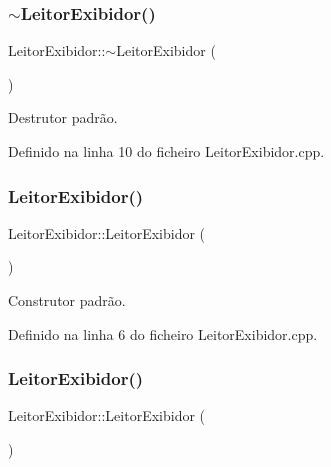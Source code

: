 \subsubsection{\texorpdfstring{$\sim$\+Leitor\+Exibidor()}{~LeitorExibidor()}}
{\footnotesize\ttfamily Leitor\+Exibidor\+::$\sim$\+Leitor\+Exibidor (\begin{DoxyParamCaption}{ }\end{DoxyParamCaption})}



Destrutor padrão. 



Definido na linha 10 do ficheiro Leitor\+Exibidor.\+cpp.

\mbox{\label{classLeitorExibidor_a246be764c0b6895539f915cc0f813e7b}} 
\subsubsection{\texorpdfstring{Leitor\+Exibidor()}{LeitorExibidor()}\hspace{0.1cm}{\footnotesize\ttfamily [1/2]}}
{\footnotesize\ttfamily Leitor\+Exibidor\+::\+Leitor\+Exibidor (\begin{DoxyParamCaption}{ }\end{DoxyParamCaption})\hspace{0.3cm}{\ttfamily [private]}}



Construtor padrão. 



Definido na linha 6 do ficheiro Leitor\+Exibidor.\+cpp.

\mbox{\label{classLeitorExibidor_a98a0f84f7d42d7868317cacfc883398d}} 
\subsubsection{\texorpdfstring{Leitor\+Exibidor()}{LeitorExibidor()}\hspace{0.1cm}{\footnotesize\ttfamily [2/2]}}
{\footnotesize\ttfamily Leitor\+Exibidor\+::\+Leitor\+Exibidor (\begin{DoxyParamCaption}\item[{\hyperlink{classLeitorExibidor}{Leitor\+Exibidor} const \&}]{ }\end{DoxyParamCaption})\hspace{0.3cm}{\ttfamily [private]}}




